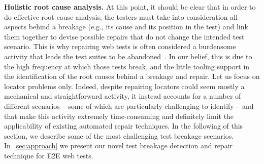 \noindent
\textbf{Holistic root cause analysis.}
At this point, it should be clear that in order to do effective root cause analysis, the testers must take into consideration all aspects behind a breakage (e.g., its cause and its position in the test) and link them together to devise possible repairs that do not change the intended test scenario. This is why repairing web tests is often considered a burdensome activity that leads the test suites to be abandoned~\cite{Christophe2014}. In our belief, this is due to the high frequency at which those tests break, and the little tooling support in the identification of the root causes behind a breakage and repair.
%
Let us focus on locator problems only. Indeed, despite repairing locators could seem mostly a mechanical and straightforward activity, it instead accounts for a number of different scenarios -- some of which are particularly challenging to identify -- and that make this activity extremely time-consuming and 
definitely limit the applicability of existing automated repair techniques. In the following of this section, we describe some of the most challenging test breakage scenarios. In~\autoref{sec:approach} we present our novel test breakage detection and repair technique for E2E web tests.

